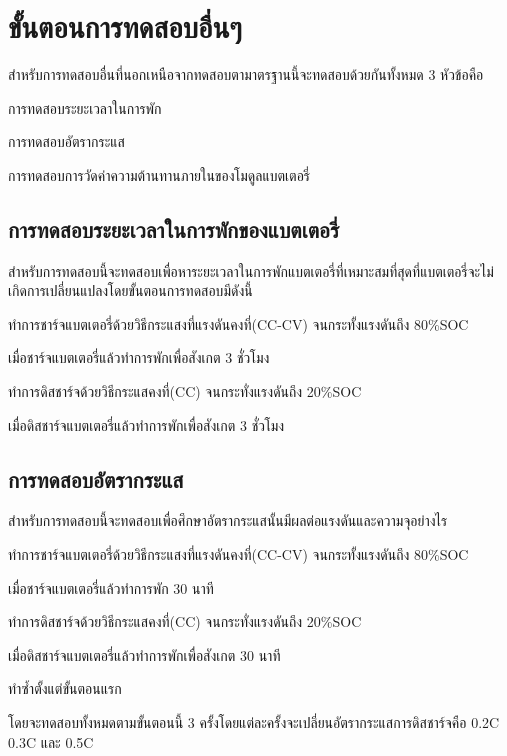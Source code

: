 \section{ขั้นตอนการทดสอบอื่นๆ}
สำหรับการทดสอบอื่นที่นอกเหนือจากทดสอบตามาตรฐานนี้จะทดสอบด้วยกันทั้งหมด 3 หัวข้อคือ
\begin{itemize}
{\item การทดสอบระยะเวลาในการพัก}
{\item การทดสอบอัตรากระแส}
{\item การทดสอบการวัดค่าความต้านทานภายในของโมดูลแบตเตอรี่}
\end{itemize}
\subsection{การทดสอบระยะเวลาในการพักของแบตเตอรี่}
สำหรับการทดสอบนี้จะทดสอบเพื่อหาระยะเวลาในการพักแบตเตอรี่ที่เหมาะสมที่สุดที่แบตเตอรี่จะไม่เกิดการเปลี่ยนแปลงโดยขั้นตอนการทดสอบมีดังนี้
\begin{enumerate}
{\item ทำการชาร์จแบตเตอรี่ด้วยวิธีกระแสงที่แรงดันคงที่(CC-CV) จนกระทั้งแรงดันถึง 80\%SOC}
{\item เมื่อชาร์จแบตเตอรี่แล้วทำการพักเพื่อสังเกต 3 ชั่วโมง}
{\item ทำการดิสชาร์จด้วยวิธีกระแสคงที่(CC) จนกระทั่งแรงดันถึง 20\%SOC}
{\item เมื่อดิสชาร์จแบตเตอรี่แล้วทำการพักเพื่อสังเกต 3 ชั่วโมง}
\end{enumerate}
\subsection{การทดสอบอัตรากระแส}
สำหรับการทดสอบนี้จะทดสอบเพื่อศึกษาอัตรากระแสนั้นมีผลต่อแรงดันและความจุอย่างไร
\begin{enumerate}
{\item ทำการชาร์จแบตเตอรี่ด้วยวิธีกระแสงที่แรงดันคงที่(CC-CV) จนกระทั้งแรงดันถึง 80\%SOC}
{\item เมื่อชาร์จแบตเตอรี่แล้วทำการพัก 30 นาที}
{\item ทำการดิสชาร์จด้วยวิธีกระแสคงที่(CC) จนกระทั่งแรงดันถึง 20\%SOC}
{\item เมื่อดิสชาร์จแบตเตอรี่แล้วทำการพักเพื่อสังเกต 30 นาที}
{\item ทำซ้ำตั้งแต่ขั้นตอนแรก}
\end{enumerate}
โดยจะทดสอบทั้งหมดตามขั้นตอนนี้ 3 ครั้งโดยแต่ละครั้งจะเปลี่ยนอัตรากระแสการดิสชาร์จคือ 0.2C 0.3C และ 0.5C
